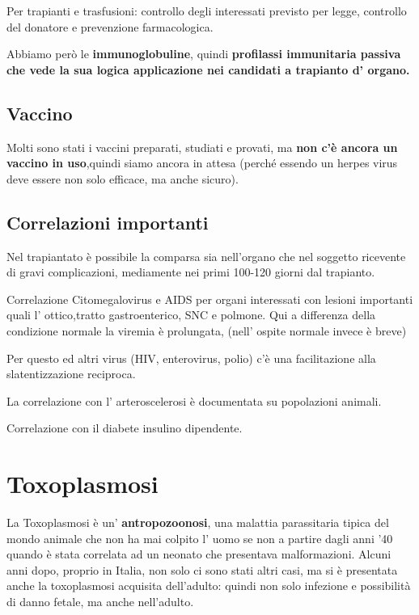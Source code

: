  Per trapianti e trasfusioni: controllo degli interessati previsto per
  legge, controllo del donatore e prevenzione farmacologica.

  Abbiamo però le \textbf{immunoglobuline}, quindi \textbf{profilassi
  immunitaria passiva che vede la sua logica applicazione nei candidati
  a trapianto d' organo.}

\subsection{Vaccino}
  Molti sono stati i vaccini preparati, studiati e provati, ma
  \textbf{non c'è ancora un vaccino in uso},quindi siamo ancora in
  attesa (perché essendo un herpes virus deve essere non solo efficace,
  ma anche sicuro).

\subsection{Correlazioni importanti}

  Nel trapiantato è possibile la comparsa sia nell'organo che nel
  soggetto ricevente di gravi complicazioni, mediamente nei primi
  100-120 giorni dal trapianto.

  Correlazione Citomegalovirus e AIDS per organi interessati con lesioni
  importanti quali l' ottico,tratto gastroenterico, SNC e polmone. Qui a
  differenza della condizione normale la viremia è prolungata, (nell'
  ospite normale invece è breve)

  Per questo ed altri virus (HIV, enterovirus, polio) c'è una
  facilitazione alla slatentizzazione reciproca.

  La correlazione con l' arteroscelerosi è documentata su popolazioni
  animali.

  Correlazione con il diabete insulino dipendente.

\section{Toxoplasmosi}
  La Toxoplasmosi è un' \textbf{antropozoonosi}, una malattia
  parassitaria tipica del mondo animale che non ha mai colpito l' uomo
  se non a partire dagli anni '40 quando è stata correlata ad un neonato
  che presentava malformazioni. Alcuni anni dopo, proprio in Italia, non
  solo ci sono stati altri casi, ma si è presentata anche la
  toxoplasmosi acquisita dell'adulto: quindi non solo infezione e
  possibilità di danno fetale, ma anche nell'adulto.


